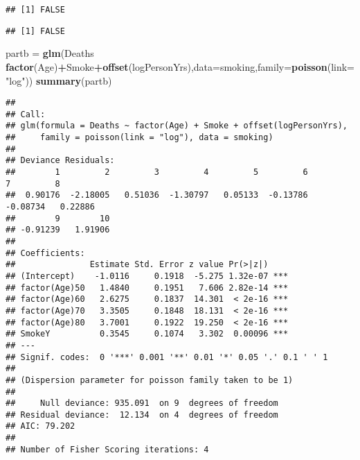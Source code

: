 \documentclass[
]{article}
\newenvironment{Shaded}{\begin{snugshade}}{\end{snugshade}}
\newcommand{\DataTypeTok}[1]{\textcolor[rgb]{0.13,0.29,0.53}{#1}}
\newcommand{\KeywordTok}[1]{\textcolor[rgb]{0.13,0.29,0.53}{\textbf{#1}}}
\newcommand{\NormalTok}[1]{#1}
\newcommand{\OperatorTok}[1]{\textcolor[rgb]{0.81,0.36,0.00}{\textbf{#1}}}
\newcommand{\StringTok}[1]{\textcolor[rgb]{0.31,0.60,0.02}{#1}}
\begin{document}
\begin{verbatim}
## [1] FALSE
\end{verbatim}

\begin{Shaded}
\end{Shaded}

\begin{verbatim}
## [1] FALSE
\end{verbatim}

\begin{Shaded}
\begin{Highlighting}[]
\NormalTok{partb =}\StringTok{ }\KeywordTok{glm}\NormalTok{(Deaths }\OperatorTok{~}\StringTok{ }\KeywordTok{factor}\NormalTok{(Age)}\OperatorTok{+}\NormalTok{Smoke}\OperatorTok{+}\KeywordTok{offset}\NormalTok{(logPersonYrs),}\DataTypeTok{data=}\NormalTok{smoking,}\DataTypeTok{family=}\KeywordTok{poisson}\NormalTok{(}\DataTypeTok{link=}\StringTok{"log"}\NormalTok{))}
\KeywordTok{summary}\NormalTok{(partb)}
\end{Highlighting}
\end{Shaded}

\begin{verbatim}
## 
## Call:
## glm(formula = Deaths ~ factor(Age) + Smoke + offset(logPersonYrs), 
##     family = poisson(link = "log"), data = smoking)
## 
## Deviance Residuals: 
##        1         2         3         4         5         6         7         8  
##  0.90176  -2.18005   0.51036  -1.30797   0.05133  -0.13786  -0.08734   0.22886  
##        9        10  
## -0.91239   1.91906  
## 
## Coefficients:
##               Estimate Std. Error z value Pr(>|z|)    
## (Intercept)    -1.0116     0.1918  -5.275 1.32e-07 ***
## factor(Age)50   1.4840     0.1951   7.606 2.82e-14 ***
## factor(Age)60   2.6275     0.1837  14.301  < 2e-16 ***
## factor(Age)70   3.3505     0.1848  18.131  < 2e-16 ***
## factor(Age)80   3.7001     0.1922  19.250  < 2e-16 ***
## SmokeY          0.3545     0.1074   3.302  0.00096 ***
## ---
## Signif. codes:  0 '***' 0.001 '**' 0.01 '*' 0.05 '.' 0.1 ' ' 1
## 
## (Dispersion parameter for poisson family taken to be 1)
## 
##     Null deviance: 935.091  on 9  degrees of freedom
## Residual deviance:  12.134  on 4  degrees of freedom
## AIC: 79.202
## 
## Number of Fisher Scoring iterations: 4
\end{verbatim}
\end{document}

